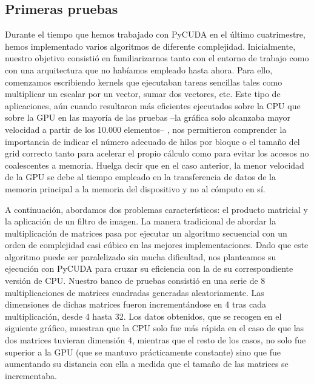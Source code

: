 \documentclass[twoside]{article}
\begin{document}
\subsection{Primeras pruebas}

Durante el tiempo que hemos trabajado con PyCUDA en el último cuatrimestre, hemos implementado varios algoritmos de diferente complejidad. Inicialmente, nuestro objetivo consistió en familiarizarnos tanto con el entorno de trabajo como con una arquitectura que no habíamos empleado hasta ahora. Para ello, comenzamos escribiendo kernels que ejecutaban tareas sencillas tales como multiplicar un escalar por un vector, sumar dos vectores, etc. Este tipo de aplicaciones, aún cuando resultaron más eficientes ejecutados sobre la CPU que sobre la GPU en las mayoría de las pruebas --la gráfica solo alcanzaba mayor velocidad a partir de los 10.000 elementos-- , nos permitieron comprender la importancia de indicar el número adecuado de hilos por bloque o el tamaño del grid correcto tanto para acelerar el propio cálculo como para evitar los accesos no coalescentes a memoria. Huelga decir que en el caso anterior, la menor velocidad de la GPU se debe al tiempo empleado en la transferencia de datos de la memoria principal a la memoria del dispositivo y no al cómputo en sí.

\vspace{5 mm}

A continuación, abordamos dos problemas característicos: el producto matricial y la aplicación de un filtro de imagen. La manera tradicional de abordar la multiplicación de matrices pasa por ejecutar un algoritmo secuencial con un orden de complejidad casi cúbico en las mejores implementaciones. Dado que este algoritmo puede ser paralelizado sin mucha dificultad, nos planteamos su ejecución con PyCUDA para cruzar su eficiencia con la de su correspondiente versión de CPU. Nuestro banco de pruebas consistió en una serie de 8 multiplicaciones de matrices cuadradas generadas aleatoriamente. Las dimensiones de dichas matrices fueron incrementándose en 4 tras cada multiplicación, desde 4 hasta 32. Los datos obtenidos, que se recogen en el siguiente gráfico, muestran que la CPU solo fue más rápida en el caso de que las dos matrices tuvieran dimensión 4, mientras que el resto de los casos, no solo fue superior a la GPU (que se mantuvo prácticamente constante) sino que fue aumentando su distancia con ella a medida que el tamaño de las matrices se incrementaba.
\end{document}
